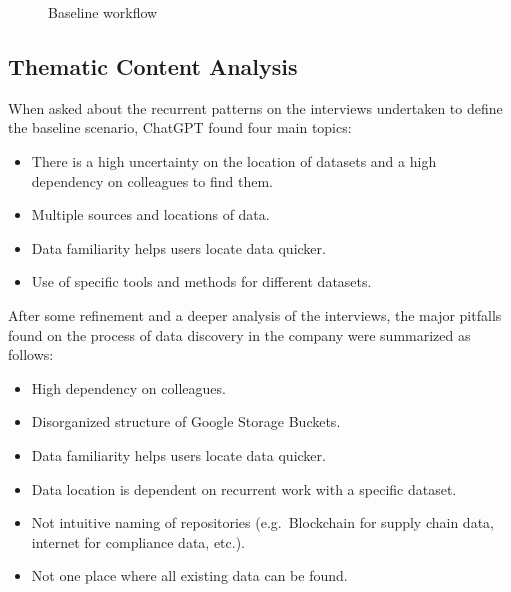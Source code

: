 \documentclass[
  oneside,
  open=any]{scrbook}
\providecommand{\tightlist}{%
  \setlength{\itemsep}{0pt}\setlength{\parskip}{0pt}}\usepackage{longtable,booktabs,array}
\begin{document}
\begin{figure}[H]


\caption{\label{fig-baseline}Baseline workflow}

\end{figure}%

\subsection{Thematic Content Analysis}\label{thematic-content-analysis}

When asked about the recurrent patterns on the interviews undertaken to
define the baseline scenario, ChatGPT found four main topics:

\begin{itemize}
\tightlist
\item
  There is a high uncertainty on the location of datasets and a high
  dependency on colleagues to find them.
\item
  Multiple sources and locations of data.
\item
  Data familiarity helps users locate data quicker.
\item
  Use of specific tools and methods for different datasets.
\end{itemize}

After some refinement and a deeper analysis of the interviews, the major
pitfalls found on the process of data discovery in the company were
summarized as follows:

\begin{itemize}
\tightlist
\item
  High dependency on colleagues.
\item
  Disorganized structure of Google Storage Buckets.
\item
  Data familiarity helps users locate data quicker.
\item
  Data location is dependent on recurrent work with a specific dataset.
\item
  Not intuitive naming of repositories (e.g.~Blockchain for supply chain
  data, internet for compliance data, etc.).
\item
  Not one place where all existing data can be found.
\end{itemize}
\end{document}
